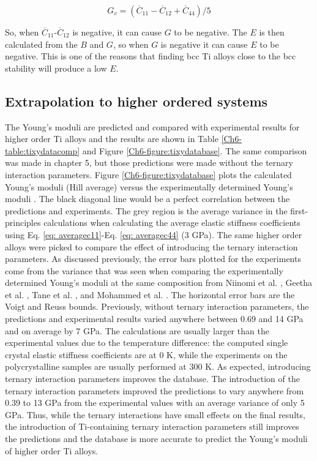 \begin{equation}
\label{eq: Gv}
G_v = \left( \overline{C}_{11}-\overline{C}_{12}+\overline{C}_{44} \right)/5
\end{equation}

So, when $\overline{C}_{11}$-$\overline{C}_{12}$ is negative, it can cause $G$ to be negative. The $E$ is then calculated from the $B$ and $G$, so when $G$ is negative it can cause $E$ to be negative. This is one of the reasons that finding bcc Ti alloys close to the bcc stability will produce a low $E$. 

\subsection{Extrapolation to higher ordered systems}

The Young's moduli are predicted and compared with experimental results for higher order Ti alloys and the results are shown in Table \ref{Ch6-table:tixydatacomp} and Figure \ref{Ch6-figure:tixydatabase}. The same comparison was made in chapter 5, but those predictions were made without the ternary interaction parameters. Figure \ref{Ch6-figure:tixydatabase} plots the calculated Young's moduli (Hill average) versus the experimentally determined Young's moduli \cite{Tane2010a,Mohammed2014,Geetha2009}. The black diagonal line would be a perfect correlation between the predictions and experiments. The grey region is the average variance in the first-principles calculations when calculating the average elastic stiffness coefficients using Eq. \ref{eq: averagec11}-Eq. \ref{eq: averagec44} (3 GPa). The same higher order alloys were picked to compare the effect of introducing the ternary interaction parameters. As discussed previously, the error bars plotted for the experiments come from the variance that was seen when comparing the experimentally determined Young's moduli at the same composition from Niinomi et al. \cite{Niinomi2012}, Geetha et al. \cite{Geetha2009}, Tane et al. \cite{Tane2010a}, and Mohammed et al. \cite{Mohammed2014}. The horizontal error bars are the Voigt and Reuss bounds. Previously, without ternary interaction parameters, the predictions and experimental results varied anywhere between 0.69 and 14 GPa and on average by 7 GPa. The calculations are usually larger than the experimental values due to the temperature difference: the computed single crystal elastic stiffness coefficients are at 0 K, while the experiments on the polycrystalline samples are usually performed at 300 K. As expected, introducing ternary interaction parameters improves the database. The introduction of the ternary interaction parameters improved the predictions to vary anywhere from 0.39 to 13 GPa from the experimental values with an average variance of only 5 GPa. Thus, while the ternary interactions have small effects on the final results, the introduction of Ti-containing ternary interaction parameters still improves the predictions and the database is more accurate to predict the Young's moduli of higher order Ti alloys. 

